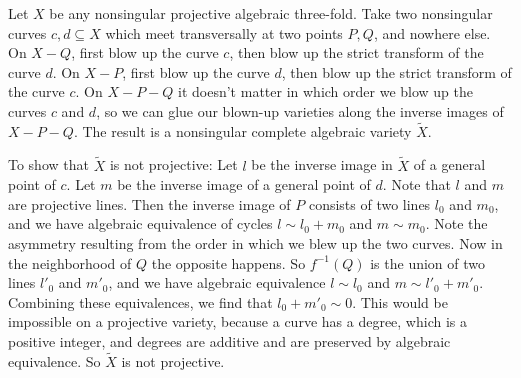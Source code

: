 Let $X$ be any nonsingular projective algebraic three-fold. Take two nonsingular curves $c,d \subseteq X$ which meet transversally at two points $P,Q$, and nowhere else. On $X - Q$, first blow up the curve $c$, then blow up the strict transform of the curve $d$. On $X - P$, first blow up the curve $d$, then blow up the strict transform of the curve $c$. On $X - P - Q$ it doesn't matter in which order we blow up the curves $c$ and $d$, so we can glue our blown-up varieties along the inverse images of $X - P - Q$. The result is a nonsingular complete algebraic variety $\tilde{X}$.

To show that $\tilde{X}$ is not projective: Let $l$ be the inverse image in $\tilde{X}$ of a general point of $c$. Let $m$ be the inverse image of a general point of $d$. Note that $l$ and $m$ are projective lines. Then the inverse image of $P$ consists of two lines $l_0$ and $m_0$, and we have algebraic equivalence of cycles $l \sim l_0 + m_0$ and $m \sim m_0$. Note the asymmetry resulting from the order in which we blew up the two curves. Now in the neighborhood of $Q$ the opposite happens. So $f^{-1}(Q)$ is the union of two lines $l'_0$ and $m'_0$, and we have algebraic equivalence $l \sim l_0$ and $m \sim l'_0 + m'_0$. Combining these equivalences, we find that $l_0 + m'_0 \sim 0$. This would be impossible on a projective variety, because a curve has a degree, which is a positive integer, and degrees are additive and are preserved by algebraic equivalence. So $\tilde{X}$ is not projective.